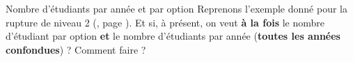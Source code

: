 \newpage
\begin{Exercice}{Nombre d'étudiants par année et par option}
	Reprenons l'exemple donné pour la rupture de niveau 2 (, 
	page \pageref{algo:rupt2}). 
	Et si, à présent,
	on veut \textbf{à la fois} le nombre d'étudiant par option 
	\textbf{et} le nombre d'étudiants par année 
	(\textbf{toutes les années confondues}) ?
	Comment faire ?
\end{Exercice}



